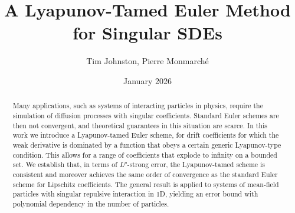 \documentclass{article}
\title{A Lyapunov-Tamed Euler Method for Singular SDEs}
\author{Tim Johnston, Pierre Monmarché}
\date{January 2026}
\begin{document}
\maketitle
\begin{abstract}
Many applications, such as systems of interacting particles in physics, require the simulation of diffusion processes with singular coefficients. Standard Euler schemes are then not convergent, and theoretical guarantees in this situation are scarce. In this work we introduce a Lyapunov-tamed Euler scheme, for drift coefficients for which the weak derivative is dominated by a function that obeys a certain generic Lyapunov-type condition. This allows for a range of coefficients that explode to infinity on a bounded set. We establish that, in terms of $L^p$-strong error, the Lyapunov-tamed scheme is consistent and moreover achieves the same order of convergence as the standard Euler scheme for Lipschitz coefficients. The general result is applied to systems of mean-field particles with singular repulsive interaction in 1D, yielding an error bound with polynomial dependency in the number of particles.
\end{abstract}





\end{document}
